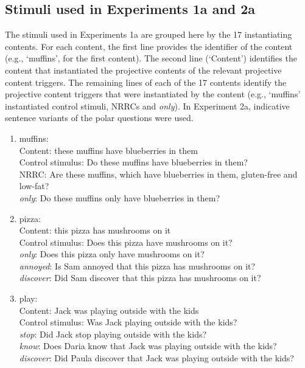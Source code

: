 \documentclass[11pt,fleqn]{article}
\newcommand{\6}{\mbox{$[\hspace*{-.6mm}[$}}
\newcommand{\9}{\mbox{$]\hspace*{-.6mm}]$}}
\begin{document}
\begin{itemize}
\appendix

\section{Stimuli used in Experiments 1a and 2a}\label{a-exp1a-2a-stimuli}

The stimuli used in Experiments 1a are grouped here by the 17 instantiating contents. For each content, the first line provides the identifier of the content (e.g., `muffins', for the first content). The second line (`Content') identifies the content that instantiated the projective contents of the relevant projective content triggers. The remaining lines of each of the 17 contents identify the projective content triggers that were instantiated by the content (e.g., `muffins' instantiated control stimuli, NRRCs and {\em only}). In Experiment 2a, indicative sentence variants of the polar questions were used.

\begin{enumerate}

\item  muffins:  \\
     Content: these muffins have blueberries in them\\
     Control stimulus: Do these muffins have blueberries in them?\\
     NRRC: Are these muffins, which have blueberries in them, gluten-free and low-fat?\\
     {\em only}: Do these muffins only have blueberries in them?

\item pizza:  \\
     Content: this pizza has mushrooms on it\\
     Control stimulus: Does this pizza have mushrooms on it?\\
     {\em only}: Does this pizza only have mushrooms on it?\\
     {\em annoyed}: Is Sam annoyed that this pizza has mushrooms on it?\\
     {\em discover}: Did Sam discover that this pizza has mushrooms on it?

\item play:  \\
     Content: Jack was playing outside with the kids\\
     Control stimulus: Was Jack playing outside with the kids?\\
     {\em stop}: Did Jack stop playing outside with the kids?\\
     {\em know}: Does Daria know that Jack was playing outside with the kids?\\
     {\em discover}: Did Paula discover that Jack was playing outside with the kids?


\end{enumerate}
\end{itemize}
\end{document}
